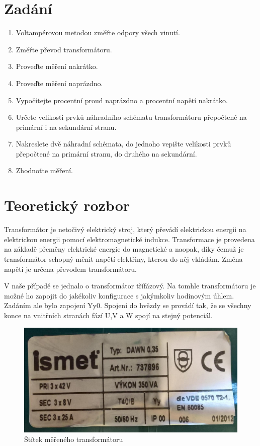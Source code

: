 \documentclass{protokol}
\begin{document}
\maketitle

\section{Zadání}
\begin{enumerate}
    \item Voltampérovou metodou změřte odpory všech vinutí.
    \item Změřte převod transformátoru.
    \item Proveďte měření nakrátko.
    \item Proveďte měření naprázdno.
    \item Vypočítejte procentní proud naprázdno a procentní napětí nakrátko.
    \item Určete velikosti prvků náhradního schématu transformátoru přepočtené na primární i na sekundární stranu.
    \item Nakreslete dvě náhradní schémata, do jednoho vepište velikosti prvků přepočtené na primární stranu, do druhého na sekundární.
    \item Zhodnoťte měření.
\end{enumerate}

\section{Teoretický rozbor}
Transformátor je netočivý elektrický stroj, který převádí elektrickou energii na elektrickou energii pomocí elektromagnetické indukce. Transformace je provedena na základě přeměny elektrické energie do magnetické a naopak, díky čemuž je transformátor schopný měnit napětí elektřiny, kterou do něj vkládám. Změna napětí je určena převodem transformátoru. 

V naše případě se jednalo o transformátor třífázový. Na tomhle transformátoru je možné ho zapojit do jakékoliv konfigurace s jakýmkoliv hodinovým úhlem. Zadáním ale bylo zapojení Yy0. Spojení do hvězdy se provádí tak, že se všechny konce na vnitřních stranách fází U,V a W spojí na stejný potenciál.

\begin{figure}[H]
    \centering
    \includegraphics[width=0.8\linewidth]{TrafoStitek.png}
    \caption{Štítek měřeného transformátoru}
    \label{fig:trafoStitek}
\end{figure}
\end{document}
